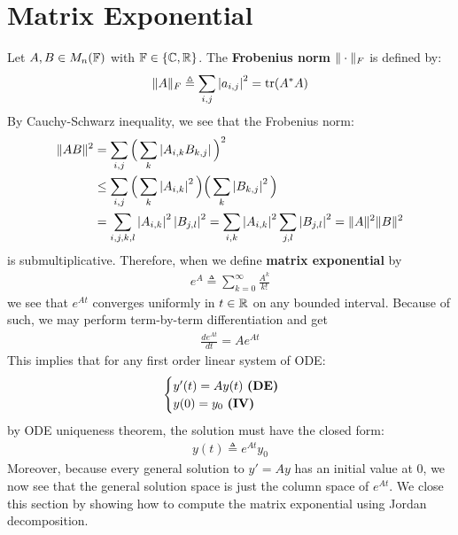 \documentclass{report}
\begin{document}
\section{Matrix Exponential}
Let $A,B \in M_n(\mathbb{F})$ with $\mathbb{F} \in \left\{ \mathbb{C},\mathbb{R} \right\}$. The \textbf{Frobenius norm} $\| \cdot \|_F$ is defined by: 
\begin{align*}
\| A \|_F \triangleq \sum_{i,j} \left|a_{i,j}\right|^2 = \operatorname{tr}(A^*A) 
\end{align*}
By Cauchy-Schwarz inequality, we see that the Frobenius norm:  
\begin{align*}
  \| AB \|^2 &= \sum_{i,j} \Big(\sum_k \left|A_{i,k}B_{k,j}\right| \Big)^2 \\
&\leq \sum_{i,j}  \Big(\sum_k \left|A_{i,k}\right|^2\Big) \Big( \sum_k \left|B_{k,j}\right|^2\Big) \\
&=\sum_{i,j,k,l} \left|A_{i,k}\right|^2 \left|B_{j,l}\right|^2 = \sum_{i,k} \left|A_{i,k}\right|^2 \sum_{j,l} \left|B_{j,l}\right|^2 = \| A \|^2 \| B \|^2
\end{align*}
is submultiplicative. Therefore, when we define   \textbf{matrix exponential} by 
\begin{align*}
e^A \triangleq \sum_{k=0}^{\infty} \frac{A^k}{k!}
\end{align*}
we see that $e^{At}$ converges uniformly in $t\in\mathbb{R}$ on any bounded interval. Because of such, we may perform term-by-term differentiation and get 
\begin{align*}
\frac{de^{At}}{dt}=Ae^{At}
\end{align*}
This implies that for any first order linear system of ODE: 
\begin{align*}
\begin{cases}
  y'(t)=Ay(t)\text{ \textbf{(DE)} } \\
  y(0)=y_0\text{ \textbf{(IV)} }
\end{cases}
\end{align*}
by ODE uniqueness theorem, the solution must have the closed form: 
\begin{align*}
y(t)\triangleq e^{At}y_0
\end{align*}
Moreover, because every general solution to $y'=Ay$ has an initial value at $0$, we now see that the general solution space is just the column space of $e^{At}$. We close this section by showing how to compute the matrix exponential using Jordan decomposition.\\ 
\end{document}
